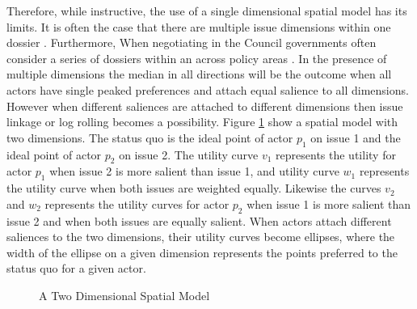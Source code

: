 Therefore, while instructive, the use of a single dimensional spatial model has its limits. It is often the case that there are multiple issue dimensions within one dossier \citep{Thomson2006a}. Furthermore, When negotiating in the Council governments often consider a series of dossiers within an across policy areas \citep{MattilaLane2001,KonigJunge2009}. In the presence of multiple dimensions the median in all directions will be the outcome when all actors have single peaked preferences and attach equal salience to all dimensions. However when different saliences are attached to different dimensions then issue linkage or log rolling becomes a possibility. Figure \ref{fig:twodimensions} show a spatial model with two dimensions. The status quo is the ideal point of actor $p_1$ on issue 1 and the ideal point of actor $p_2$ on issue 2. The utility curve $v_1$ represents the utility for actor $p_1$ when issue 2 is more salient than issue 1, and utility curve $w_1$ represents the utility curve when both issues are weighted equally. Likewise the curves $v_2$ and $w_2$ represents the utility curves for actor $p_2$ when issue 1 is more salient than issue 2 and when both issues are equally salient. When actors attach different saliences to the two dimensions, their utility curves become ellipses, where the width of the ellipse on a given dimension represents the points preferred to the status quo for a given actor.  

\begin{figure}[htpb]
  \centering
  \caption{A Two Dimensional Spatial Model}
  \label{fig:twodimensions}
\end{figure}

